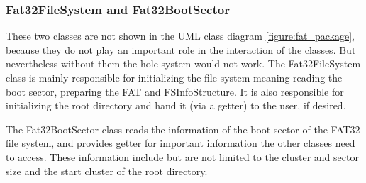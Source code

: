 \subsubsection{Fat32FileSystem and Fat32BootSector}

These two classes are not shown in the UML class diagram \ref{figure:fat_package}, because they do not play an important role in the interaction of the classes. But nevertheless without them the hole system would not work. The Fat32FileSystem class is mainly responsible for initializing the file system meaning reading the boot sector, preparing the FAT and FSInfoStructure. It is also responsible for initializing the root directory and hand it (via a getter) to the user, if desired.

The Fat32BootSector class reads the information of the boot sector of the FAT32 file system, and provides getter for important information the other classes need to access. These information include but are not limited to the cluster and sector size and the start cluster of the root directory.